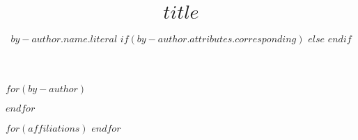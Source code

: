\title{$title$}

$for(by-author)$
\author[$if(by-author.affiliations)$$for(by-author.affiliations)$$it.id$$sep$,$endfor$$endif$%
]{$by-author.name.literal$
$if(by-author.attributes.corresponding)$
$else$
$endif$
}

$endfor$

$for(affiliations)$
$endfor$


